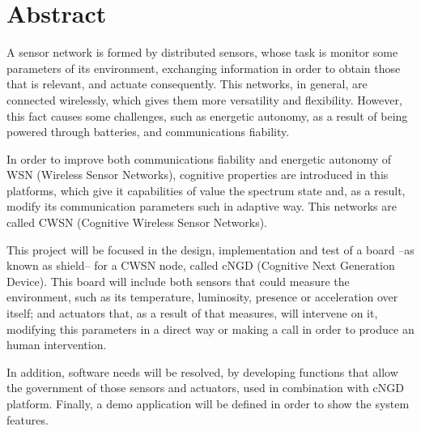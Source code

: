 %
%
%
%
%

\chapter{Abstract}

A sensor network is formed by distributed sensors, whose task is monitor some parameters of its environment, exchanging information in order to obtain those that is relevant, and actuate consequently. This networks, in general, are connected wirelessly, which gives them more versatility and flexibility. However, this fact causes some challenges, such as energetic autonomy, as a result of being powered through batteries, and communications fiability.

\vspace{.5cm}

In order to improve both communications fiability and energetic autonomy of WSN (Wireless Sensor Networks), cognitive properties are introduced in this platforms, which give it capabilities of value the spectrum state and, as a result, modify its communication parameters such in adaptive way. This networks are called CWSN (Cognitive Wireless Sensor Networks).

\vspace{.5cm}

This project will be focused in the design, implementation and test of a board --as known as shield-- for a CWSN node, called cNGD (Cognitive Next Generation Device). This board will include both sensors that could measure the environment, such as its temperature, luminosity, presence or acceleration over itself; and actuators that, as a result of that measures, will intervene on it, modifying this parameters in a direct way or making a call in order to produce an human intervention.

\vspace{.5cm}

In addition, software needs will be resolved, by developing functions that allow the government of those sensors and actuators, used in combination with cNGD platform. Finally, a demo application will be defined in order to show the system features.

